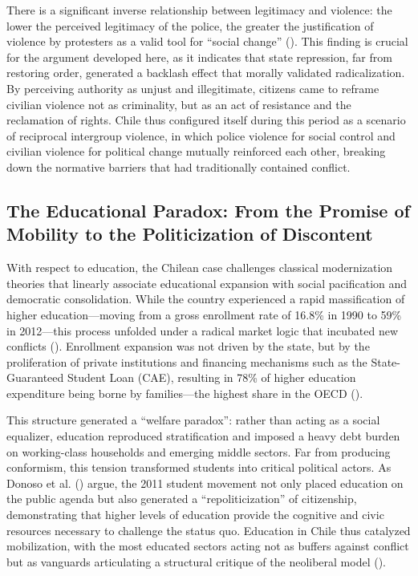 \documentclass[
  13pt,
]{article}
\begin{document}
There is a significant inverse relationship between legitimacy and
violence: the lower the perceived legitimacy of the police, the greater
the justification of violence by protesters as a valid tool for ``social
change'' (). This finding is crucial for the argument developed here, as
it indicates that state repression, far from restoring order, generated
a backlash effect that morally validated radicalization. By perceiving
authority as unjust and illegitimate, citizens came to reframe civilian
violence not as criminality, but as an act of resistance and the
reclamation of rights. Chile thus configured itself during this period
as a scenario of reciprocal intergroup violence, in which police
violence for social control and civilian violence for political change
mutually reinforced each other, breaking down the normative barriers
that had traditionally contained conflict.

\subsection{The Educational Paradox: From the Promise of Mobility to the
Politicization of
Discontent}\label{the-educational-paradox-from-the-promise-of-mobility-to-the-politicization-of-discontent}

With respect to education, the Chilean case challenges classical
modernization theories that linearly associate educational expansion
with social pacification and democratic consolidation. While the country
experienced a rapid massification of higher education---moving from a
gross enrollment rate of 16.8\% in 1990 to 59\% in 2012---this process
unfolded under a radical market logic that incubated new conflicts
(). Enrollment
expansion was not driven by the state, but by the proliferation of
private institutions and financing mechanisms such as the
State-Guaranteed Student Loan (CAE), resulting in 78\% of higher
education expenditure being borne by families---the highest share in the
OECD ().

This structure generated a ``welfare paradox'': rather than acting as a
social equalizer, education reproduced stratification and imposed a
heavy debt burden on working-class households and emerging middle
sectors. Far from producing conformism, this tension transformed
students into critical political actors. As Donoso et al.
() argue, the
2011 student movement not only placed education on the public agenda but
also generated a ``repoliticization'' of citizenship, demonstrating that
higher levels of education provide the cognitive and civic resources
necessary to challenge the status quo. Education in Chile thus catalyzed
mobilization, with the most educated sectors acting not as buffers
against conflict but as vanguards articulating a structural critique of
the neoliberal model ().
\end{document}
